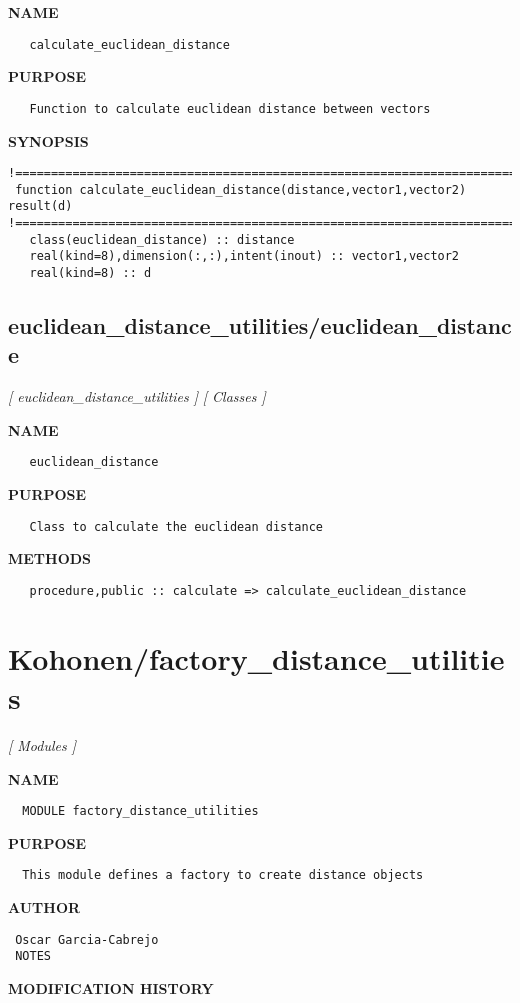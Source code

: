 \documentclass{article}
\begin{document}
\label{ch:robo12}
\label{ch:euclidean_distance_utilities_calculate_euclidean_distance}
\textbf{NAME}
\begin{verbatim}
   calculate_euclidean_distance
\end{verbatim}
\textbf{PURPOSE}
\begin{verbatim}
   Function to calculate euclidean distance between vectors 
\end{verbatim}
\textbf{SYNOPSIS}
\begin{verbatim}
!========================================================================================
 function calculate_euclidean_distance(distance,vector1,vector2) result(d)
!========================================================================================
   class(euclidean_distance) :: distance
   real(kind=8),dimension(:,:),intent(inout) :: vector1,vector2
   real(kind=8) :: d
\end{verbatim}
\newpage
\subsection{euclidean\_distance\_utilities/euclidean\_distance}
\textsl{[ euclidean\_distance\_utilities ]}
\textsl{[ Classes ]}

\label{ch:robo13}
\label{ch:euclidean_distance_utilities_euclidean_distance}
\textbf{NAME}
\begin{verbatim}
   euclidean_distance
\end{verbatim}
\textbf{PURPOSE}
\begin{verbatim}
   Class to calculate the euclidean distance 
\end{verbatim}
\textbf{METHODS}
\begin{verbatim}
   procedure,public :: calculate => calculate_euclidean_distance
\end{verbatim}
\newpage
\section{Kohonen/factory\_distance\_utilities}
\textsl{[ Modules ]}

\label{ch:robo2}
\label{ch:Kohonen_factory_distance_utilities}
\textbf{NAME}
\begin{verbatim}
  MODULE factory_distance_utilities
\end{verbatim}
\textbf{PURPOSE}
\begin{verbatim}
  This module defines a factory to create distance objects 
\end{verbatim}
\textbf{AUTHOR}
\begin{verbatim}
 Oscar Garcia-Cabrejo
 NOTES 
\end{verbatim}
\textbf{MODIFICATION HISTORY}
\newpage
\end{document}

